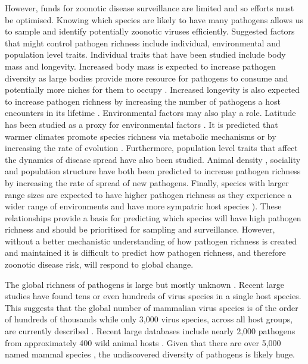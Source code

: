 However, funds for zoonotic disease surveillance are limited and so efforts must be optimised.
Knowing which species are likely to have many pathogens allows us to sample and identify potentially zoonotic viruses efficiently.
Suggested factors that might control pathogen richness include individual, environmental and population level traits.
Individual traits that have been studied include body mass and longevity.
Increased body mass is expected to increase pathogen diversity as large bodies provide more resource for pathogens to consume and potentially more niches for them to occupy \cite{kamiya2014determines, arneberg2002host, poulin1995phylogeny} .
Increased longevity is also expected to increase pathogen richness by increasing the number of pathogens a host encounters in its lifetime \cite{nunn2003comparative, ezenwa2006host}. 
Environmental factors may also play a role. 
Latitude has been studied as a proxy for environmental factors \cite{poulin2010latitudinal, kamiya2014determines}.
It is predicted that warmer climates promote species richness via metabolic mechanisms or by increasing the rate of evolution \cite{brown2004toward, dunn2010global, rohde1992latitudinal}.
Furthermore, population level traits that affect the dynamics of disease spread have also been studied.
Animal density \cite{kamiya2014determines, nunn2003comparative, arneberg2002host}, sociality \cite{bordes2007rodent, vitone2004body, altizer2003social, ezenwa2006host} and population structure \cite{nunes2006localized, maganga2014bat, gay2014parasite, turmelle2009correlates} have both been predicted to increase pathogen richness by increasing the rate of spread of new pathogens.
Finally, species with larger range sizes are expected to have higher pathogen richness as they experience a wider range of environments and have more sympatric host species \cite{kamiya2014determines, nunn2003comparative}).
These relationships provide a basis for predicting which species will have high pathogen richness and should be prioritised for sampling and surveillance.
However, without a better mechanistic understanding of how pathogen richness is created and maintained it is difficult to predict how pathogen richness, and therefore zoonotic disease risk, will respond to global change.


The global richness of pathogens is large but mostly unknown \cite{poulin2014parasite}.
Recent large studies have found tens \cite{anthony2013strategy} or even hundreds \cite{anthony2015non} of virus species in a single host species.
This suggests that the global number of mammalian virus species is of the order of hundreds of thousands \cite{anthony2013strategy} while only 3,000 virus species, across all host groups, are currently described \cite{ICTV}.
Recent large databases include nearly 2,000 pathogens from approximately 400 wild animal hosts \cite{wardeh2015database}.
Given that there are over 5,000 named mammal species \cite{wilson2005mammal}, the undiscovered diversity of pathogens is likely huge.

